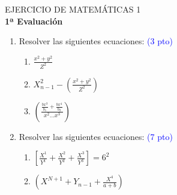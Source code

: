 \documentclass[10pt,a4paper]{article}
\begin{document}
\center \textcolor[rgb] {1,0,0} {EJERCICIO DE MATEMÁTICAS 1 }\\
\bigskip{}
\bf 1ª Evaluación\\
\flushleft 
\begin{enumerate}
\item Resolver las siguientes ecuaciones: \textcolor{blue} {(3 pto)}
\begin{enumerate}
 \item $\frac{x^2 +y^2}{Z^2}$
 \item $X^2_{n-1}-(\frac{x^2 +y^2}{Z^2})$
 \item $\left( \frac{\frac{bx^3}{b_1}+\frac{bx^4}{b_2}}{x^2 \ldots x^3} \right)$
\end{enumerate}
\item Resolver las siguientes ecuaciones: \textcolor{blue} {(7 pto)}
\begin{enumerate}
\item $\left[\frac{X^1}{Y^1}+\frac{X^2}{Y^2} +\frac{X^3}{Y^3}\right] = 6^2$
\item $\left ( X^{N+1}+Y_{n-1} +\frac{X^4}{a+b}\right) $
\end{enumerate}


\end{enumerate}
\end{document}
